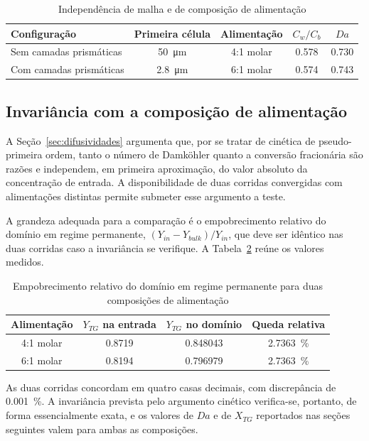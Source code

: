 \begin{table}[htb]
\centering
\caption{Independência de malha e de composição de alimentação}
\label{tab:malhas}
\begin{tabular}{l c c c c}
\toprule
Configuração & Primeira célula & Alimentação & $C_w/C_b$ & $Da$ \\
\midrule
Sem camadas prismáticas & \SI{50}{\micro\meter}  & \num{4}:\num{1} molar & \num{0.578} & \num{0.730} \\
Com camadas prismáticas & \SI{2.8}{\micro\meter} & \num{6}:\num{1} molar & \num{0.574} & \num{0.743} \\
\bottomrule
\end{tabular}
\end{table}

\subsection{Invariância com a composição de alimentação}
\label{sec:invariancia}

A Seção~\ref{sec:difusividades} argumenta que, por se tratar de cinética de
pseudo-primeira ordem, tanto o número de Damköhler quanto a conversão
fracionária são razões e independem, em primeira aproximação, do valor absoluto
da concentração de entrada. A disponibilidade de duas corridas convergidas com
alimentações distintas permite submeter esse argumento a teste.

A grandeza adequada para a comparação é o empobrecimento relativo do domínio em
regime permanente, $(Y_{in} - Y_{bulk})/Y_{in}$, que deve ser idêntico nas duas
corridas caso a invariância se verifique. A Tabela~\ref{tab:invariancia} reúne
os valores medidos.

\begin{table}[htb]
\centering
\caption{Empobrecimento relativo do domínio em regime permanente para duas
composições de alimentação}
\label{tab:invariancia}
\begin{tabular}{c c c c}
\toprule
Alimentação & $Y_{TG}$ na entrada & $Y_{TG}$ no domínio & Queda relativa \\
\midrule
\num{4}:\num{1} molar & \num{0.8719} & \num{0.848043} & \SI{2.7363}{\percent} \\
\num{6}:\num{1} molar & \num{0.8194} & \num{0.796979} & \SI{2.7363}{\percent} \\
\bottomrule
\end{tabular}
\end{table}

As duas corridas concordam em quatro casas decimais, com discrepância de
\SI{0.001}{\percent}. A invariância prevista pelo argumento cinético verifica-se,
portanto, de forma essencialmente exata, e os valores de $Da$ e de $X_{TG}$
reportados nas seções seguintes valem para ambas as composições.

